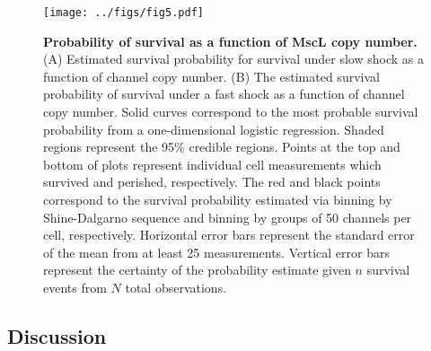 \begin{figure}
\centering
\texttt{[image: ../figs/fig5.pdf]}
\caption{\textbf{Probability
of
survival
as a
function
of
MscL
copy
number.}
(A)
Estimated
survival
probability
for
survival
under
slow
shock
as a
function
of
channel
copy
number.
(B)
The
estimated
survival
probability
of
survival
under
a fast
shock
as a
function
of
channel
copy
number.
Solid
curves
correspond
to the
most
probable
survival
probability
from a
one-dimensional
logistic
regression.
Shaded
regions
represent
the
95\%
credible
regions.
Points
at the
top
and
bottom
of
plots
represent
individual
cell
measurements
which
survived
and
perished,
respectively.
The
red
and
black
points
correspond
to the
survival
probability
estimated
via
binning
by
Shine-Dalgarno
sequence
and
binning
by
groups
of 50
channels
per
cell,
respectively.
Horizontal
error
bars
represent
the
standard
error
of the
mean
from
at
least
25
measurements.
Vertical
error
bars
represent
the
certainty
of the
probability
estimate
given
\(n\)
survival
events
from
\(N\)
total
observations.}\label{fig:survival}
\end{figure}

\subsection{Discussion}\label{discussion}

